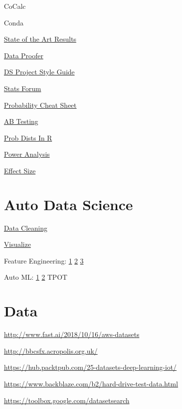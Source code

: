 \documentclass[]{book}
\begin{document}
CoCalc

Conda

\href{https://paperswithcode.com/sota}{State of the Art Results}

\href{http://dataproofer.org/}{Data Proofer}

\href{https://www.dataquest.io/blog/data-science-project-style-guide/}{DS
Project Style Guide}

\href{https://discourse.datamethods.org/}{Stats Forum}

\href{http://www.wzchen.com/probability-cheatsheet}{Probability Cheat
Sheet}

\href{http://www.evanmiller.org/announcing-evans-awesome-ab-tools.html}{AB
Testing}

\href{http://www.cyclismo.org/tutorial/R/probability.html}{Prob Dists In
R}

\href{https://www.statmethods.net/stats/power.html}{Power Analysis}

\href{https://www.leeds.ac.uk/educol/documents/00002182.htm}{Effect
Size}

\section{Auto Data Science}\label{auto-data-science}

\href{http://www.dataland.ai/index.php}{Data Cleaning}

\href{http://holoviews.org}{Visualize}

Feature Engineering: \href{https://www.featuretools.com}{1} \textbar{}
\href{https://towardsdatascience.com/automated-feature-engineering-in-python-99baf11cc219}{2}
\textbar{} \href{https://www.featurelabs.com/}{3}

Auto ML: \href{https://cloud.google.com/automl/}{1} \textbar{}
\href{http://www.ml4aad.org}{2} \textbar{} TPOT

\section{Data}\label{data}

\url{http://www.fast.ai/2018/10/16/aws-datasets}

\url{http://bbcsfx.acropolis.org.uk/}

\url{https://hub.packtpub.com/25-datasets-deep-learning-iot/}

\url{https://www.backblaze.com/b2/hard-drive-test-data.html}

\url{https://toolbox.google.com/datasetsearch}
\end{document}
